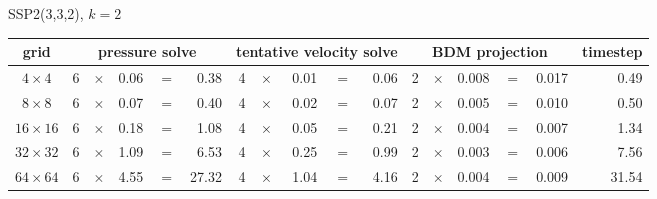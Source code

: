 \begin{center}
    SSP2(3,3,2), $k=2$\\[1ex]
    \begin{tabular}{|c|rcrcr|rcrcr|rcrcr|r|}
        \hline
        grid                                           &
        \multicolumn{5}{|c|}{pressure solve}           &
        \multicolumn{5}{|c|}{tentative velocity solve} &
        \multicolumn{5}{|c|}{BDM projection}           &
        timestep                                                                                                                                                           \\
        \hline\hline
        $ 4\times 4$                                   & 6 & $\times$ & 0.06 & $=$ & 0.38  & 4 & $\times$ & 0.01 & $=$ & 0.06 & 2 & $\times$ & 0.008 & $=$ & 0.017 & 0.49  \\
        $ 8\times 8$                                   & 6 & $\times$ & 0.07 & $=$ & 0.40  & 4 & $\times$ & 0.02 & $=$ & 0.07 & 2 & $\times$ & 0.005 & $=$ & 0.010 & 0.50  \\
        $16\times16$                                   & 6 & $\times$ & 0.18 & $=$ & 1.08  & 4 & $\times$ & 0.05 & $=$ & 0.21 & 2 & $\times$ & 0.004 & $=$ & 0.007 & 1.34  \\
        $32\times32$                                   & 6 & $\times$ & 1.09 & $=$ & 6.53  & 4 & $\times$ & 0.25 & $=$ & 0.99 & 2 & $\times$ & 0.003 & $=$ & 0.006 & 7.56  \\
        $64\times64$                                   & 6 & $\times$ & 4.55 & $=$ & 27.32 & 4 & $\times$ & 1.04 & $=$ & 4.16 & 2 & $\times$ & 0.004 & $=$ & 0.009 & 31.54 \\
        \hline\end{tabular}
\end{center}

